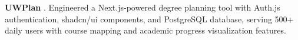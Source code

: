 \textbf{UWPlan} \href{https://github.com/pl3lee/uwplan}{\faGithub}. Engineered a Next.js-powered degree planning tool with Auth.js authentication, shadcn/ui components, and PostgreSQL database, serving 500+ daily users with course mapping and academic progress visualization features.
